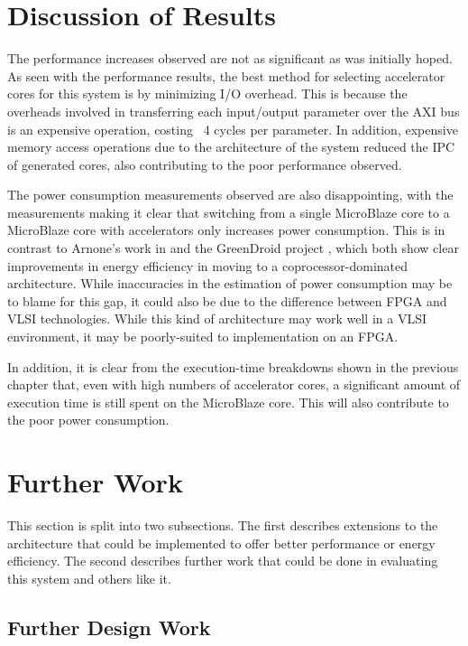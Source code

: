 \documentclass{UoYCSproject}
\begin{document}
\section{Discussion of Results}

The performance increases observed are not as significant as was initially hoped.
As seen with the performance results, the best method for selecting accelerator cores for this system is by minimizing
I/O overhead. This is because the overheads involved in transferring each input/output parameter over the AXI bus is an
expensive operation, costing ~4 cycles per parameter. In addition, expensive memory access operations
due to the architecture of the system reduced the IPC of generated cores, also contributing to
the poor performance observed.

The power consumption measurements observed are also disappointing, with the measurements making it clear that
switching from a single MicroBlaze core to a MicroBlaze core with accelerators only increases power consumption.
This is in contrast to Arnone's work in \cite{arnone-thesis} and the GreenDroid project \cite{greendroid},
which both show clear improvements in energy efficiency in moving to a coprocessor-dominated architecture.
While inaccuracies in the estimation of power consumption may be to blame for this gap, it could also be due to
the difference between FPGA and VLSI technologies. While this kind of architecture may work well in a VLSI environment,
it may be poorly-suited to implementation on an FPGA.

In addition, it is clear from the execution-time breakdowns shown in the previous chapter that, even with high numbers
of accelerator cores, a significant amount of execution time is still spent on the MicroBlaze core. This will also contribute
to the poor power consumption.

\section{Further Work}

This section is split into two subsections. The first describes extensions to the architecture that could be implemented
to offer better performance or energy efficiency. The second describes further work that could be done in evaluating this
system and others like it.

\subsection{Further Design Work}
\end{document}
